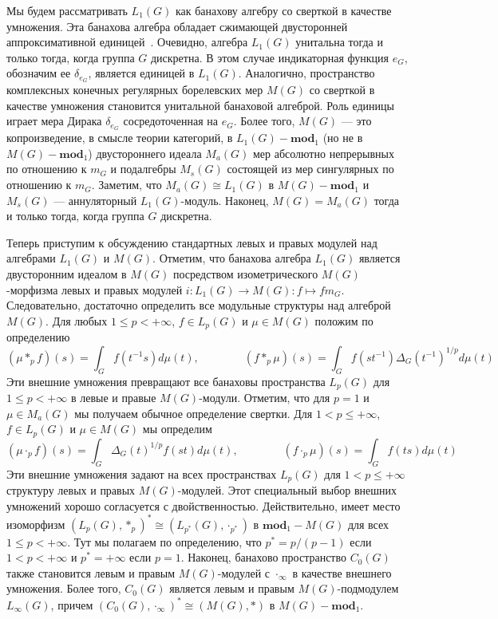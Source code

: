 \documentclass{article}
\numberwithin{equation}{section}
\theoremstyle{plain}
\theoremstyle{definition}
\newcommand{\convol}{\ast}
\newcommand{\isom}{\mathop{\mathbin{\cong}}}
\begin{document}
\begin{fulltext}
Мы будем рассматривать $L_1(G)$ как банахову алгебру со сверткой в качестве
умножения. Эта банахова алгебра обладает сжимающей двусторонней аппроксимативной
единицей~\cite[теорема~3.3.23]{DalBanAlgAutCont}. Очевидно, алгебра $L_1(G)$
унитальна тогда и только тогда, когда группа $G$ дискретна. В этом случае
индикаторная функция $e_G$, обозначим ее $\delta_{e_G}$, является единицей в
$L_1(G)$. Аналогично, пространство комплексных конечных регулярных борелевских
мер $M(G)$ со сверткой в качестве умножения становится унитальной банаховой
алгеброй. Роль единицы играет мера Дирака $\delta_{e_G}$ сосредоточенная на
$e_G$. Более того, $M(G)$ --- это копроизведение, в смысле теории категорий, в
$L_1(G)-\mathbf{mod}_1$ (но не в $M(G)-\mathbf{mod}_1$) двустороннего идеала
$M_a(G)$ мер абсолютно непрерывных по отношению к $m_G$ и подалгебры $M_s(G)$
состоящей из мер сингулярных по отношению к $m_G$. Заметим, что $M_a(G)\isom
L_1(G)$ в $M(G)-\mathbf{mod}_1$ и $M_s(G)$ --- аннуляторный $L_1(G)$-модуль.
Наконец, $M(G)=M_a(G)$ тогда и только тогда, когда группа $G$ дискретна.

Теперь приступим к обсуждению стандартных левых и правых модулей над алгебрами
$L_1(G)$ и $M(G)$. Отметим, что банахова алгебра $L_1(G)$ является двусторонним
идеалом в $M(G)$ посредством изометрического $M(G)$-морфизма левых и правых
модулей $i:L_1(G)\to M(G):f\mapsto f m_G$. Следовательно, достаточно определить
все модульные структуры над алгеброй $M(G)$. Для любых $1\leq p<+\infty$, $f\in
L_p(G)$ и $\mu\in M(G)$ положим по определению
\[
(\mu\convol_p f)(s)=\int_G f(t^{-1}s)d\mu(t),
\qquad\qquad
(f\convol_p \mu)(s)=\int_G f(st^{-1}){\Delta_G(t^{-1})}^{1/p}d\mu(t)
\]
Эти внешние умножения превращают все банаховы пространства $L_p(G)$ для $1\leq
p<+\infty$ в левые и правые $M(G)$-модули. Отметим, что для $p=1$ и $\mu\in
M_a(G)$ мы получаем обычное определение свертки. Для $1<p\leq +\infty$, $f\in
L_p(G)$ и $\mu\in M(G)$ мы определим
\[
(\mu\cdot_p f)(s)=\int_G {\Delta_G(t)}^{1/p}f(st)d\mu(t),
\qquad\qquad
(f\cdot_p \mu)(s)=\int_G f(ts)d\mu(t)
\]
Эти внешние умножения задают на всех пространствах $L_p(G)$ для $1<p\leq+\infty$
структуру левых и правых $M(G)$-модулей. Этот специальный выбор внешних
умножений хорошо согласуется с двойственностью. Действительно, имеет место
изоморфизм ${(L_p(G),\convol_p)}^*\isom (L_{p^*}(G),\cdot_{p^*})$ в
$\mathbf{mod}_1-M(G)$ для всех $1\leq p<+\infty$. Тут мы полагаем по
определению, что $p^*=p/(p-1)$ если $1<p<+\infty$ и $p^*=+\infty$ если $p=1$.
Наконец, банахово пространство $C_0(G)$ также становится левым и правым
$M(G)$-модулей с $\cdot_\infty$ в качестве внешнего умножения. Более того,
$C_0(G)$ является левым и правым $M(G)$-подмодулем $L_\infty(G)$, причем
${(C_0(G),\cdot_\infty)}^*\isom (M(G),\convol)$ в $M(G)-\mathbf{mod}_1$.


\end{fulltext}
\end{document}
